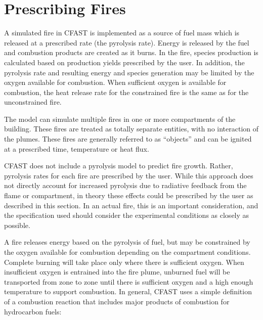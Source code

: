 \section{Prescribing Fires}

A simulated fire in CFAST is implemented as a source of fuel mass which is released at a prescribed rate (the pyrolysis rate). Energy is released by the fuel and combustion products are created as it burns. In the fire, species production is calculated based on production yields prescribed by the user. In addition, the pyrolysis rate and resulting energy and species generation may be limited by the oxygen available for combustion. When sufficient oxygen is available for combustion, the heat release rate for the constrained fire is the same as for the unconstrained fire.

The model can simulate multiple fires in one or more compartments of the building.  These fires are treated as totally separate entities, with no interaction of the plumes. These fires are generally referred to as “objects” and can be ignited at a prescribed time, temperature or heat flux.

CFAST does not include a pyrolysis model to predict fire growth. Rather, pyrolysis rates for each fire are prescribed by the user.  While this approach does not directly account for increased pyrolysis due to radiative feedback from the flame or compartment, in theory these effects could be prescribed by the user as described in this section.  In an actual fire, this is an important consideration, and the specification used should consider the experimental conditions as closely as possible.

A fire releases energy based on the pyrolysis of fuel, but may be constrained by the oxygen available for combustion depending on the compartment conditions. Complete burning will take place only where there is sufficient oxygen.  When insufficient oxygen is entrained into the fire plume, unburned fuel will be transported from zone to zone until there is sufficient oxygen and a high enough temperature to support combustion.  In general, CFAST uses a simple definition of a combustion reaction that includes major products of combustion for hydrocarbon fuels:

